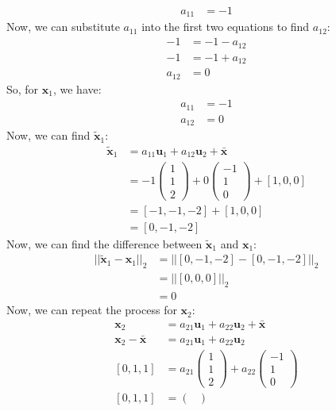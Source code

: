 \documentclass[a3paper,12pt]{extarticle} %
\begin{document}
\begin{enumerate}
\begin{align}
a_{11} &= -1
\end{align}
Now, we can substitute $a_{11}$ into the first two equations to find $a_{12}$:
\begin{align}
-1 &= -1 - a_{12}\\
-1 &= -1 + a_{12}\\
a_{12} &= 0
\end{align}
So, for $\mathbf{x}_1$, we have:
\begin{align}
a_{11} &= -1\\
a_{12} &= 0
\end{align}
Now, we can find $\tilde{\mathbf{x}}_1$:
\begin{align}
\tilde{\mathbf{x}}_1 &= a_{11}\mathbf{u}_1 + a_{12}\mathbf{u}_2 + \bar{\mathbf{x}}\\
&= -1\begin{pmatrix}
1\\
1\\
2
\end{pmatrix} + 0\begin{pmatrix}
-1\\
1\\
0
\end{pmatrix} + [1, 0, 0]\\
&= [-1, -1, -2] + [1, 0, 0]\\
&= [0, -1, -2]
\end{align}
Now, we can find the difference between $\tilde{\mathbf{x}}_1$ and $\mathbf{x}_1$:
\begin{align}
||\tilde{\mathbf{x}}_1 - \mathbf{x}_1||_2 &= ||[0, -1, -2] - [0, -1, -2]||_2\\
&= ||[0, 0, 0]||_2\\
&= 0
\end{align}
Now, we can repeat the process for $\mathbf{x}_2$:
\begin{align}
\mathbf{x}_2 &= a_{21}\mathbf{u}_1 + a_{22}\mathbf{u}_2 + \bar{\mathbf{x}}\\
\mathbf{x}_2 - \bar{\mathbf{x}} &= a_{21}\mathbf{u}_1 + a_{22}\mathbf{u}_2\\
[0, 1, 1] &= a_{21}\begin{pmatrix}
1\\
1\\
2
\end{pmatrix} + a_{22}\begin{pmatrix}
-1\\
1\\
0
\end{pmatrix}\\
[0, 1, 1] &= \begin{pmatrix}

\end{pmatrix}
\end{align}
\end{enumerate}
\end{document}
